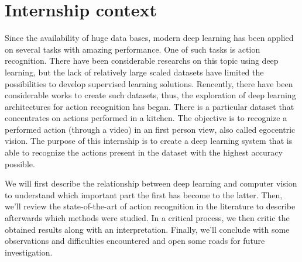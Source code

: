 \documentclass[12pt, a4paper]{report}
\begin{document}
		\section{Internship context}
			Since the availability of huge data bases, modern deep learning has been applied on several tasks with amazing performance.
			One of such tasks is action recognition.
			There have been considerable researchs on this topic using deep learning, but the lack of relatively large scaled datasets have limited the possibilities to develop supervised learning solutions.
			Rencently, there have been considerable works to create such datasets, thus, the exploration of deep learning architectures for action recognition has began.
			There is a particular dataset that concentrates on actions performed in a kitchen.
			The objective is to recognize a performed action (through a video) in an first person view, also called egocentric vision.
			The purpose of this internship is to create a deep learning system that is able to recognize the actions present in the dataset with the highest accuracy possible.\par
			\bigbreak
			We will first describe the relationship between deep learning and computer vision to understand which important part the first has become to the latter.
			Then, we'll review the state-of-the-art of action recognition in the literature to describe afterwards which methods were studied.
			In a critical process, we then critic the obtained results along with an interpretation.
			Finally, we'll conclude with some observations and difficulties encountered and open some roads for future investigation.
\end{document}
